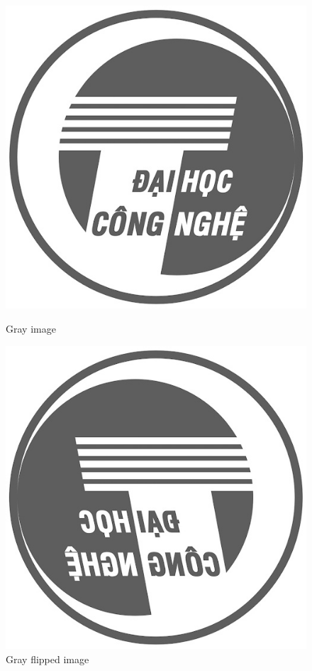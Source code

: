 \documentclass[a4paper]{article}
\begin{document}
\begin{figure}[ht]
  \centering
  \begin{minipage}[b]{0.4\textwidth}
    \includegraphics[width=\textwidth]{images/gray.jpg}
    \caption{Gray image}
  \end{minipage}
  \hfill
  \begin{minipage}[b]{0.4\textwidth}
    \includegraphics[width=\textwidth]{images/gray_flipped.jpg}
    \caption{Gray flipped image}
  \end{minipage}
\end{figure}
\end{document}
